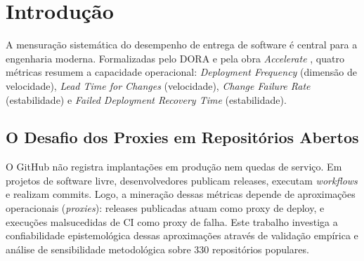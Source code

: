 \documentclass[12pt]{article}
\begin{document}
\section{Introdução}

A mensuração sistemática do desempenho de entrega de software é central para a engenharia moderna. Formalizadas pelo DORA e pela obra \textit{Accelerate} \cite{forsgren2018accelerate}, quatro métricas resumem a capacidade operacional: \textit{Deployment Frequency} (dimensão de velocidade), \textit{Lead Time for Changes} (velocidade), \textit{Change Failure Rate} (estabilidade) e \textit{Failed Deployment Recovery Time} (estabilidade).

\subsection{O Desafio dos Proxies em Repositórios Abertos}
O GitHub não registra implantações em produção nem quedas de serviço. Em projetos de software livre, desenvolvedores publicam releases, executam \textit{workflows} e realizam commits. Logo, a mineração dessas métricas depende de aproximações operacionais (\textit{proxies}): releases publicadas atuam como proxy de deploy, e execuções malsucedidas de CI como proxy de falha. Este trabalho investiga a confiabilidade epistemológica dessas aproximações através de validação empírica e análise de sensibilidade metodológica sobre 330 repositórios populares.
\end{document}
